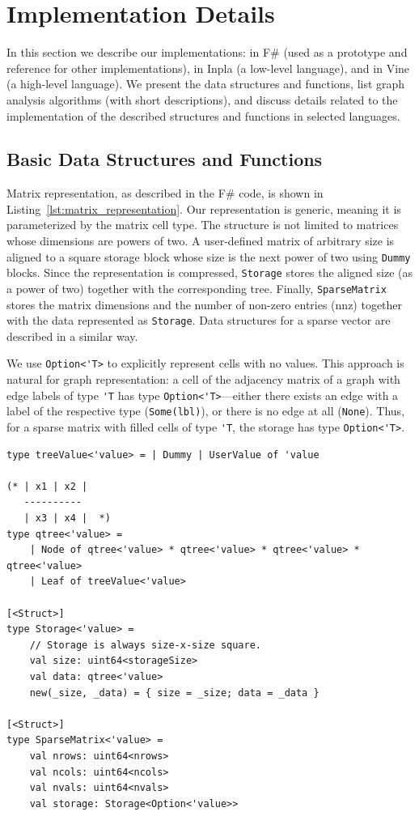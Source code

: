 \section{Implementation Details}\label{sec:implementation_details}

In this section we describe our implementations: in F\# (used as a prototype and reference for other implementations), in Inpla (a low-level language), and in Vine (a high-level language).
We present the data structures and functions, list graph analysis algorithms (with short descriptions), and discuss details related to the implementation of the described structures and functions in selected languages.

\subsection{Basic Data Structures and Functions}\label{sec:basic_structures_and_functions}

Matrix representation, as described in the F\# code, is shown in Listing~\ref{lst:matrix_representation}.
Our representation is generic, meaning it is parameterized by the matrix cell type.
The structure is not limited to matrices whose dimensions are powers of two.
A user-defined matrix of arbitrary size is aligned to a square storage block whose size is the next power of two using \verb|Dummy| blocks.
Since the representation is compressed, \verb|Storage| stores the aligned size (as a power of two) together with the corresponding tree. Finally, \verb|SparseMatrix| stores the matrix dimensions and the number of non-zero entries (nnz) together with the data represented as \verb|Storage|.
Data structures for a sparse vector are described in a similar way.

We use \verb|Option<'T>| to explicitly represent cells with no values.
This approach is natural for graph representation: a cell of the adjacency matrix of a graph with edge labels of type \verb|'T| has type \verb|Option<'T>|---either there exists an edge with a label of the respective type (\verb|Some(lbl)|), or there is no edge at all (\verb|None|).
Thus, for a sparse matrix with filled cells of type \verb|'T|, the storage has type \verb|Option<'T>|.

\begin{listing}
\begin{verbatim}
type treeValue<'value> = | Dummy | UserValue of 'value

(* | x1 | x2 |
   ----------
   | x3 | x4 |  *)
type qtree<'value> =
    | Node of qtree<'value> * qtree<'value> * qtree<'value> * qtree<'value>
    | Leaf of treeValue<'value>

[<Struct>]
type Storage<'value> =
    // Storage is always size-x-size square.
    val size: uint64<storageSize>
    val data: qtree<'value>
    new(_size, _data) = { size = _size; data = _data }

[<Struct>]
type SparseMatrix<'value> =
    val nrows: uint64<nrows>
    val ncols: uint64<ncols>
    val nvals: uint64<nvals>
    val storage: Storage<Option<'value>>
\end{verbatim}
\caption{Matrix representation}
\label{lst:matrix_representation}
\end{listing}

